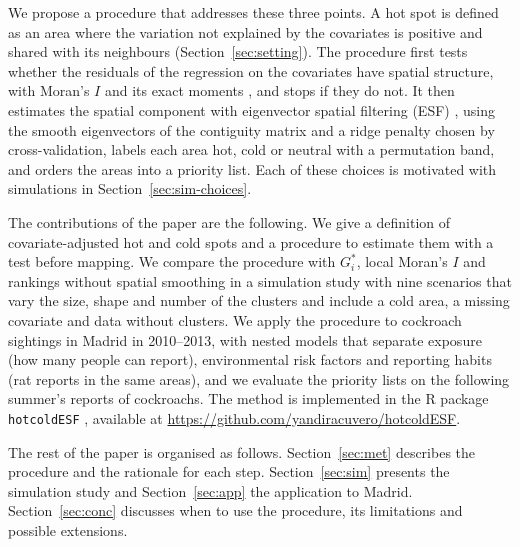 We propose a procedure that addresses these three points. A hot spot is defined as an area where the variation not explained by the covariates is positive and shared with its neighbours (Section~\ref{sec:setting}). The procedure first tests whether the residuals of the regression on the covariates have spatial structure, with Moran's $I$ and its exact moments \citep{tg07}, and stops if they do not. It then estimates the spatial component with eigenvector spatial filtering (ESF) \citep{grif2000,grif03}, using the smooth eigenvectors of the contiguity matrix and a ridge penalty chosen by cross-validation, labels each area hot, cold or neutral with a permutation band, and orders the areas into a priority list. Each of these choices is motivated with simulations in Section~\ref{sec:sim-choices}.

The contributions of the paper are the following. We give a definition of covariate-adjusted hot and cold spots and a procedure to estimate them with a test before mapping. We compare the procedure with $G_i^*$, local Moran's $I$ and rankings without spatial smoothing in a simulation study with nine scenarios that vary the size, shape and number of the clusters and include a cold area, a missing covariate and data without clusters. We apply the procedure to cockroach sightings in Madrid in 2010--2013, with nested models that separate exposure (how many people can report), environmental risk factors and reporting habits (rat reports in the same areas), and we evaluate the priority lists on the following summer's reports of cockroachs. The method is implemented in the R package \texttt{hotcoldESF} \citep{hotcoldesf2026}, available at \url{https://github.com/yandiracuvero/hotcoldESF}.

The rest of the paper is organised as follows. Section~\ref{sec:met} describes the procedure and the rationale for each step. Section~\ref{sec:sim} presents the simulation study and Section~\ref{sec:app} the application to Madrid. Section~\ref{sec:conc} discusses when to use the procedure, its limitations and possible extensions.
